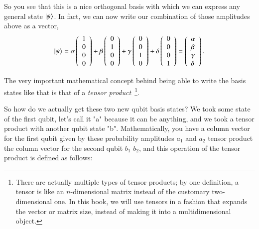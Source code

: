 So you see that this is a nice orthogonal basis with which we can express any general state $\left| \psi \right\rangle$. In fact, we can now write our combination of those amplitudes above as a vector,
\begin{equation}
\left| \psi \right\rangle=\alpha\left(\begin{array}{l}
1 \\
0 \\
0 \\
0
\end{array}\right) + \beta\left(\begin{array}{l}
0 \\
1 \\
0 \\
0
\end{array}\right)+\gamma\left(\begin{array}{l}
0 \\
0 \\
1 \\
0
\end{array}\right)+\delta\left(\begin{array}{l}
0 \\
0 \\
0 \\
1
\end{array}\right)=\left(\begin{array}{l}
\alpha \\
\beta \\
\gamma \\
\delta
\end{array}\right).
\end{equation}

The very important mathematical concept behind being able to write the basis states like that is that of a \emph{tensor product}~\footnote{There are actually multiple types of tensor products; by one definition, a tensor is like an $n$-dimensional matrix instead of the customary two-dimensional one.  In this book, we will use tensors in a fashion that expands the vector or matrix size, instead of making it into a multidimensional object.}.

So how do we actually get these two new qubit basis states? We took some state of the first qubit, let's call it "a" because it can be anything, and we took a tensor product with another qubit state "b". Mathematically, you have a column vector for the first qubit given by these probability amplitudes $a_1$ and $a_2$ tensor product the column vector for the second qubit $b_1$ $b_2$, and this operation of the tensor product is defined as follows:


